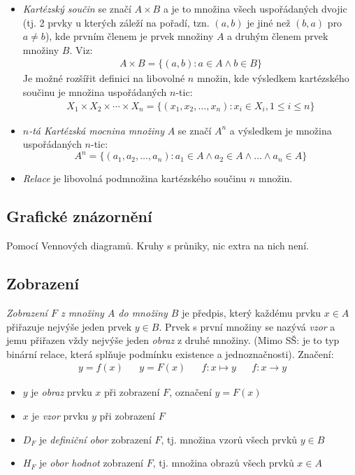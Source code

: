\documentclass[12pt]{article}
\begin{document}
\begin{itemize}
\item \emph{Kartézský součin} se značí $A \times B$ a je to množina všech uspořádaných dvojic (tj. 2 prvky u kterých záleží na pořadí, tzn. $(a,b)$ je jiné než $(b, a)$ pro $a \neq b$), kde prvním členem je prvek množiny $A$ a druhým členem prvek množiny $B$. Viz:
\begin{align}
A \times B = \{ (a,b): a \in A \land b \in B \}
\end{align}
Je možné rozšířit definici na libovolné $n$ množin, kde výsledkem kartézského součinu je množina uspořádaných $n$-tic:
\begin{align}
 X_{1}\times X_{2}\times \dotsm \times X_{n}=\{(x_{1},x_{2},\dotsc ,x_{n}):x_{i}\in X_{i},1\leq i\leq n\}
\end{align}
\item \emph{$n$-tá Kartézská mocnina množiny} $A$ se značí $A^n$ a výsledkem je množina uspořádaných $n$-tic:
\begin{equation}
A^n = \{ \left(a_1, a_2, \dotsc, a_n \right): a_1 \in A \land a_2 \in A \land \dotso \land a_n \in A \}
\end{equation}
\item \emph{Relace} je libovolná podmnožina kartézského součinu $n$ množin.
\end{itemize}
\subsection{Grafické znázornění}
Pomocí Vennových diagramů. Kruhy s průniky, nic extra na nich není.
\subsection{Zobrazení}
\emph{Zobrazení $F$ z množiny $A$ do množiny $B$} je předpis, který každému prvku $ x \in A$ přiřazuje nejvýše jeden prvek $y \in B$. Prvek s první množiny se nazývá \emph{vzor} a jemu přiřazen vždy nejvýše jeden \emph{obraz} z druhé množiny. (Mimo SŠ: je to typ binární relace, která splňuje podmínku existence a jednoznačnosti). Značení:
\begin{align}
y = f(x) && y = F(x) && f: x \mapsto y && f: x \to y
\end{align}
\begin{itemize}
\item $y$ je \emph{obraz} prvku $x$ při zobrazení $F$, označení $y =F(x)$
\item $x$ je \emph{vzor} prvku $y$ při zobrazení $F$
\item $D_F$ je \emph{definiční obor} zobrazení $F$, tj. množina vzorů všech prvků $ y \in B$
\item $H_F$ je \emph{obor hodnot} zobrazení $F$, tj. množina obrazů všech prvků $ x \in A$ 
\end{itemize}
\end{document}
